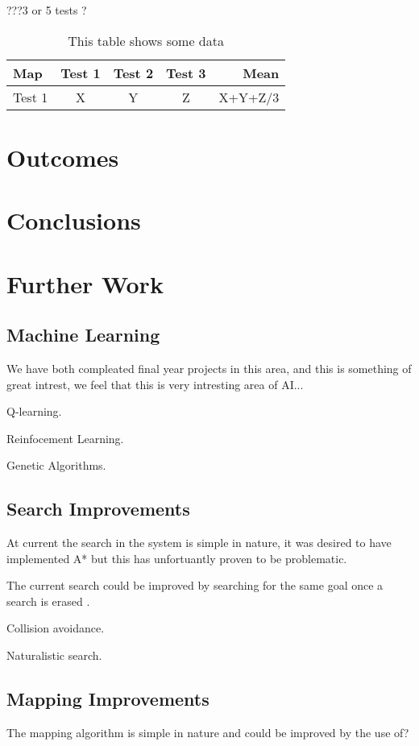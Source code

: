 \documentclass[a4paper,oneside]{report}
\begin{document}
	???3 or 5 tests ? 
	
	
	\begin{table}[position specifier]
		\centering
		\begin{tabular}{| l | c | c | c | r |}
		\hline
			Map & Test 1 & Test 2 & Test 3 & Mean \\ \hline
			Test 1 &  X & Y & Z & X+Y+Z/3 \\ \hline
		\end{tabular}
		\caption{This table shows some data}
		\label{tab:myfirsttable}
	\end{table}
	
	
\section{Outcomes}

\section{Conclusions}

\section{Further Work}

	\subsection{Machine Learning}
		We have both compleated final year projects in this area, and this is something of great intrest, we feel that this is very intresting area of AI...

		
		
		Q-learning.
		
		Reinfocement Learning.
		
		Genetic Algorithms. 
	
	\subsection{Search Improvements}
		At current the search in the system is simple in nature, it was desired to have implemented A* but this has unfortuantly proven to be problematic.
		
		The current search could be improved by searching for the same goal once a search is erased .
		
		
		Collision avoidance.
		
		Naturalistic search. 
		
	\subsection{Mapping Improvements}
		The mapping algorithm is simple in nature and could be improved by the use of? 
		
\end{document}

